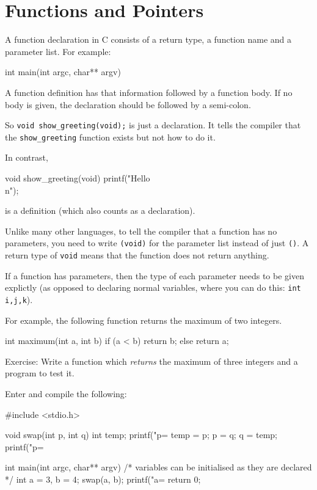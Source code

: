 
\chapter{Functions and Pointers}

A function declaration in C consists of a return type, a function name and a parameter list.
For example:
\begin{codeinline}
int main(int argc, char** argv)
\end{codeinline}
A function definition has that information followed by a function body. 
If no body is given, the declaration should be followed by a semi-colon.

So \lstinline!void show_greeting(void);!  is just a declaration.
It tells the compiler that the \texttt{show\_greeting} function exists but not how to do it.

In contrast,
\begin{codeinline}
void show_greeting(void) {
    printf("Hello\\n");
}
\end{codeinline}

\noindent is a definition (which also counts as a declaration).

Unlike many other languages, to tell the compiler that a function has no parameters, you 
need to write \lstinline!(void)! for the parameter list instead of just \lstinline!()!.
A return type of \lstinline!void! means that the function does not return anything.

If a function has parameters, then the type of each parameter needs to be given explictly (as
opposed to declaring normal variables, where you can do this: \lstinline!int i,j,k!).

For example, the following function returns the maximum of two integers.
\begin{codeblock}
int maximum(int a, int b) {
    if (a < b) {
        return b;
    } else {
        return a;
    }
}
\end{codeblock}

Exercise: Write a function which \emph{returns} the maximum of three integers and a program to test it.

Enter and compile the following:
\begin{codeblock}
#include <stdio.h>

void swap(int p, int q) {
    int temp;
    printf("p=%
    temp = p;
    p = q;
    q = temp;
    printf("p=%
}

int main(int argc, char** argv) {
    /* variables can be initialised as they are declared */
    int a = 3, b = 4;
    swap(a, b);
    printf("a=%
    return 0;
}
\end{codeblock}

